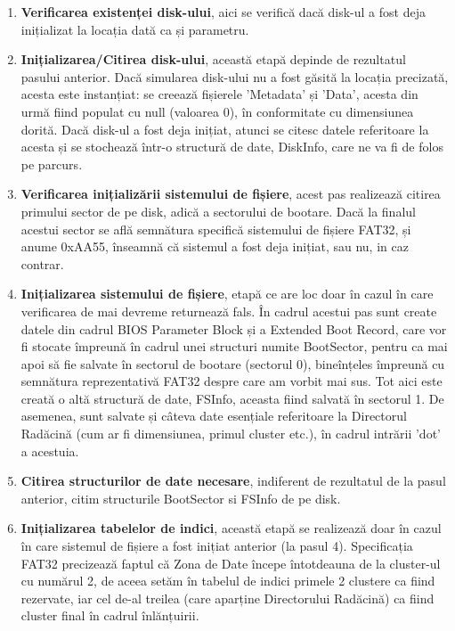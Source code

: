\begin{enumerate}
  \item \textbf{Verificarea existenței disk-ului}, aici se verifică dacă disk-ul a fost deja inițializat la locația dată ca și parametru.

  \item \textbf{Inițializarea/Citirea disk-ului}, această etapă depinde de rezultatul pasului anterior. Dacă simularea disk-ului nu a fost găsită la locația precizată, acesta este instanțiat: se creează fișierele 'Metadata' și 'Data', acesta din urmă fiind populat cu null (valoarea 0), în conformitate cu dimensiunea dorită. Dacă disk-ul a fost deja inițiat, atunci se citesc datele referitoare la acesta și se stochează într-o structură de date, DiskInfo, care ne va fi de folos pe parcurs.

  \item \textbf{Verificarea inițializării sistemului de fișiere}, acest pas realizează citirea primului sector de pe disk, adică a sectorului de bootare. Dacă la finalul acestui sector se află semnătura specifică sistemului de fișiere FAT32, și anume 0xAA55, înseamnă că sistemul a fost deja inițiat, sau nu, in caz contrar.

  \item \textbf{Inițializarea sistemului de fișiere}, etapă ce are loc doar în cazul în care verificarea de mai devreme returnează fals. În cadrul acestui pas sunt create datele din cadrul BIOS Parameter Block și a Extended Boot Record, care vor fi stocate împreună în cadrul unei structuri numite BootSector, pentru ca mai apoi să fie salvate în sectorul de bootare (sectorul 0), bineînțeles împreună cu semnătura reprezentativă FAT32 despre care am vorbit mai sus. Tot aici este creată o altă structură de date, FSInfo, aceasta fiind salvată în sectorul 1. De asemenea, sunt salvate și câteva date esențiale referitoare la Directorul Radăcină (cum ar fi dimensiunea, primul cluster etc.), în cadrul intrării 'dot' a acestuia.

  \item \textbf{Citirea structurilor de date necesare}, indiferent de rezultatul de la pasul anterior, citim structurile BootSector si FSInfo de pe disk.

  \item \textbf{Inițializarea tabelelor de indici}, această etapă se realizează doar în cazul în care sistemul de fișiere a fost inițiat anterior (la pasul 4). Specificația FAT32 precizează faptul că Zona de Date începe întotdeauna de la cluster-ul cu numărul 2, de aceea setăm în tabelul de indici primele 2 clustere ca fiind rezervate, iar cel de-al treilea (care aparține Directorului Radăcină) ca fiind cluster final în cadrul înlănțuirii.
  
\end{enumerate}

